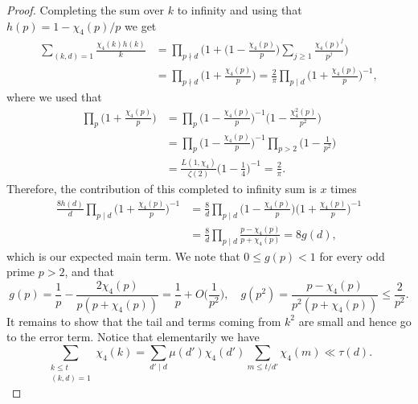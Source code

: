 \documentclass[12pt]{amsart}
\theoremstyle{remark}
\begin{document}
\begin{proof}
    Completing the sum over $k$ to infinity and using that $h(p) = 1-\chi_4(p)/p$ we get
    \[
        \begin{split}
            \sum_{(k,d) = 1}\frac{\chi_4(k)h(k)}{k} &= \prod_{p \nmid d} \biggl( 1 + \biggl(1-\frac{\chi_4(p)}{p}\biggr) \sum_{j \ge 1} \frac{\chi_4(p)^j}{p^j} \biggr) \\
            &= \prod_{p \nmid d}\biggl( 1 + \frac{\chi_4(p)}{p}\biggr) = \frac{2}{\pi} \prod_{p\mid d}\biggl(1+\frac{\chi_4(p)}{p}\biggr)^{-1},
        \end{split}
    \]
    where we used that
    \[
        \begin{split}
             \prod_{p}\biggl( 1 + \frac{\chi_4(p)}{p}\biggr) &= \prod_{p}\biggl( 1 - \frac{\chi_4(p)}{p}\biggr)^{-1} \biggl( 1 - \frac{\chi_4^2(p)}{p^2}\biggr) \\ 
             & = \prod_{p}\biggl( 1 - \frac{\chi_4(p)}{p}\biggr)^{-1} \prod_{p > 2}\biggl( 1 - \frac{1}{p^2}\biggr) \\
             &= \frac{L(1, \chi_4)}{\zeta(2)} \biggl(1-\frac{1}{4}\biggr)^{-1} = \frac{2}{\pi}.
        \end{split}
    \]
    Therefore, the contribution of this completed to infinity sum is $x$ times
    \[
        \begin{split}
            \frac{8h(d)}{d} \prod_{p \mid d} \biggl(1+\frac{\chi_4(p)}{p}\biggr)^{-1} &= \frac{8}{d} \prod_{p \mid d} \biggl(1-\frac{\chi_4(p)}{p}\biggr) \biggl(1+\frac{\chi_4(p)}{p}\biggr)^{-1}\\
            &= \frac{8}{d} \prod_{p \mid d} \frac{p-\chi_4(p)}{p+\chi_4(p)} = 8g(d),
        \end{split}
    \]
    which is our expected main term.
    We note that $0 \le g(p) < 1$ for every odd prime $p > 2$, and that
    \[
        g(p) = \frac{1}{p}-\frac{2\chi_4(p)}{p(p+\chi_4(p))} = \frac{1}{p} + O\biggl(\frac{1}{p^2}\biggr), \quad
        g(p^2) = \frac{p-\chi_4(p)}{p^2(p+\chi_4(p))} \le \frac{2}{p^2}.
    \]
    It remains to show that the tail and terms coming from $k^2$ are small and hence go to the error term.
    Notice that elementarily we have
    \[
        \sum_{\substack{k \le t \\ (k,d)=1}} \chi_4(k) = \sum_{d' \mid d} \mu(d') \chi_4(d')  \sum_{m \le t/d'} \chi_4(m) \ll \tau(d).
    \]


\end{proof}
\end{document}
